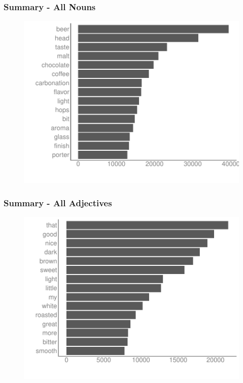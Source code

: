 \begin{frame}
    \frametitle{Summary - All Nouns}
    \label{stats_nouns}
\begin{figure}[htb]
\includegraphics[scale=0.55,left]{img/figures/bar_nouns}
\end{figure}
\vspace{-40pt}
\begin{flushright}
\hyperlink{review_nouns}{}
\end{flushright}
\end{frame}

\begin{frame}
    \frametitle{Summary - All Adjectives}
    \label{stats_adjectives}
\begin{figure}[htb]
\includegraphics[scale=0.55,left]{img/figures/bar_adj}
\end{figure}
\vspace{-40pt}
\begin{flushright}
\hyperlink{review_adjectives}{}
\end{flushright}
\end{frame}